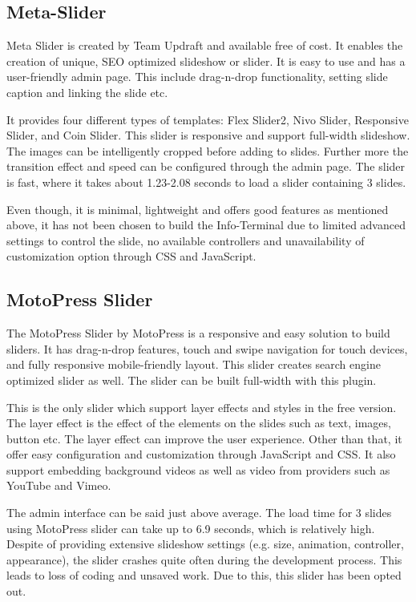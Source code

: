 \subsection{Meta-Slider}
Meta Slider is created by Team Updraft and available free of cost. It enables the creation of unique, SEO optimized slideshow or slider. It is easy to use and has a user-friendly admin page. This include drag-n-drop functionality, setting slide caption and linking the slide etc.

It provides four different types of templates: Flex Slider2, Nivo Slider, Responsive Slider, and Coin Slider. This slider is responsive and support full-width slideshow. The images can be intelligently cropped before adding to slides. Further more the transition effect and speed can be configured through the admin page. The slider is fast, where it takes about 1.23-2.08 seconds to load a slider containing 3 slides.

Even though, it is minimal, lightweight and offers good features as mentioned above, it has not been chosen to build the Info-Terminal due to limited advanced settings to control the slide, no available controllers and unavailability of customization option through CSS and JavaScript.

\subsection{MotoPress Slider}
The MotoPress Slider by MotoPress is a responsive and easy solution to build sliders. It has drag-n-drop features, touch and swipe navigation for touch devices, and fully responsive mobile-friendly layout. This slider creates search engine optimized slider as well. The slider can be built full-width with this plugin.

This is the only slider which support layer effects and styles in the free version. The layer effect is the effect of the elements on the slides such as text, images, button etc. The layer effect can improve the user experience. Other than that, it offer easy configuration and customization through JavaScript and CSS. It also support embedding background videos as well as video from providers such as YouTube and Vimeo.

The admin interface can be said just above average. The load time for 3 slides using MotoPress slider can take up to 6.9 seconds, which is relatively high. Despite of providing extensive slideshow settings (e.g. size, animation, controller, appearance), the slider crashes quite often during the development process. This leads to loss of coding and unsaved work. Due to this, this slider has been opted out.

